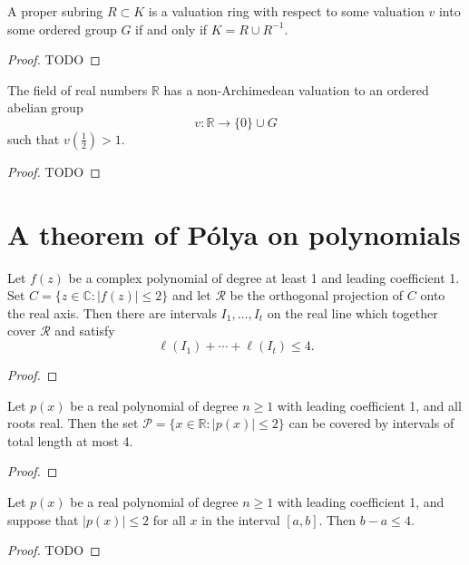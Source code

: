 \begin{lemma}
  \label{valuation_lemma}
  A proper subring $R\subset K$ is a valuation ring with respect to some
  valuation $v$ into some ordered group $G$ if and only if $K = R \cup R^{-1}$.
\end{lemma}
\begin{proof}
  TODO
\end{proof}

\begin{theorem}
  \label{valuation_on_reals}
  The field of real numbers $\mathbb{R}$ has a non-Archimedean valuation
  to an ordered abelian group
  \[v: \mathbb{R} \to \{0\} \cup G\]
  such that $v(\frac{1}{2}) > 1$.
\end{theorem}
\begin{proof}
  TODO
\end{proof}


\chapter{A theorem of Pólya on polynomials}

\begin{theorem}
  \label{ch23theorem1}
  Let $f(z)$ be a complex polynomial of degree at least 1 and leading coefficient 1. Set $C = \{ z \in \mathbb{C} : |f(z)| \leq 2 \}$ and let $\mathcal{R}$ be the orthogonal projection of $C$ onto the real axis. Then there are intervals $I_1, \dots, I_t$ on the real line which together cover $\mathcal{R}$ and satisfy
  \[
  \ell(I_1) + \cdots + \ell(I_t) \leq 4.
  \]
\end{theorem}
\begin{proof}
\end{proof}

\begin{theorem}
  \label{ch23theorem2}
  Let $p(x)$ be a real polynomial of degree $n \geq 1$ with leading coefficient 1, and all roots real.
  Then the set $\mathcal{P} = \{x \in \mathbb{R} : |p(x)| \leq 2\}$ can be covered by intervals of
  total length at most 4.
\end{theorem}
\begin{proof}
\end{proof}

\begin{corollary}
  \label{ch23corollary}
  Let $p(x)$ be a real polynomial of degree $n \geq 1$ with leading coefficient 1, and suppose that $|p(x)| \leq 2$ for all $x$ in the interval $[a, b]$. Then $b - a \leq 4$.
\end{corollary}
\begin{proof}
  TODO
\end{proof}


